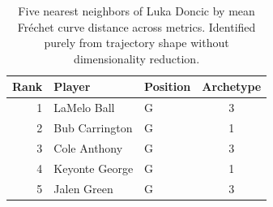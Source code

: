 \begin{table}[htbp]
  \centering\small
  \begin{tabular}{rllc}
    \toprule
    Rank & Player & Position & Archetype \\
    \midrule
    1 & LaMelo Ball & G & 3 \\
    2 & Bub Carrington & G & 1 \\
    3 & Cole Anthony & G & 3 \\
    4 & Keyonte George & G & 1 \\
    5 & Jalen Green & G & 3 \\
    \bottomrule
  \end{tabular}
  \caption{Five nearest neighbors of Luka Doncic by mean Fr\'{e}chet curve distance across metrics. Identified purely from trajectory shape without dimensionality reduction.}
  \label{tab:Luka_Doncic_frechet_curve_neighbors}
\end{table}

